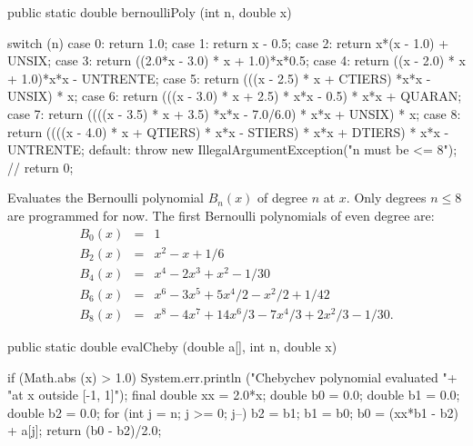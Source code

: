   \begin{htmlonly}
 \end{htmlonly}
\begin{code}

   public static double bernoulliPoly (int n, double x) \begin{hide} {
      switch (n) {
      case 0:
         return 1.0;
      case 1:
         return x - 0.5;
      case 2:
         return x*(x - 1.0) + UNSIX;
      case 3:
         return ((2.0*x - 3.0) * x + 1.0)*x*0.5;
      case 4:
         return ((x - 2.0) * x + 1.0)*x*x - UNTRENTE;
      case 5:
         return (((x - 2.5) * x + CTIERS) *x*x - UNSIX) * x;
      case 6:
         return (((x - 3.0) * x + 2.5) * x*x - 0.5) * x*x + QUARAN;
      case 7:
         return ((((x - 3.5) * x + 3.5) *x*x - 7.0/6.0) * x*x + UNSIX) * x;
      case 8:
         return ((((x - 4.0) * x +
                  QTIERS) * x*x - STIERS) * x*x + DTIERS) * x*x - UNTRENTE;
      default:
         throw new IllegalArgumentException("n must be <= 8");
      }
    //  return 0;
    }\end{hide}
\end{code}
\begin{tabb} Evaluates the Bernoulli polynomial $B_n(x)$ of degree $n$
  at $x$. Only degrees $n\le 8$ are programmed for now.
 The first Bernoulli polynomials of even degree are:
\begin{eqnarray}
B_0(x) &=& 1 \nonumber \\
B_2(x) &=& x^2-x+1/6 \nonumber \\
B_4(x) &=& x^4-2x^3+x^2-1/30 \label{bernoulli}\\
B_6(x) &=& x^6-3x^5+5x^4/2-x^2/2+1/42 \nonumber \\
B_8(x) &=& x^8-4x^7+14x^6/3 - 7x^4/3 +2x^2/3-1/30. \nonumber
\end{eqnarray}
\end{tabb}
\begin{code}

   public static double evalCheby (double a[], int n, double x) \begin{hide} {
      if (Math.abs (x) > 1.0)
         System.err.println ("Chebychev polynomial evaluated "+
                               "at x outside [-1, 1]");
      final double xx = 2.0*x;
      double b0 = 0.0;
      double b1 = 0.0;
      double b2 = 0.0;
      for (int j = n; j >= 0; j--) {
         b2 = b1;
         b1 = b0;
         b0 = (xx*b1 - b2) + a[j];
      }
      return (b0 - b2)/2.0;
   }\end{hide}
\end{code}
